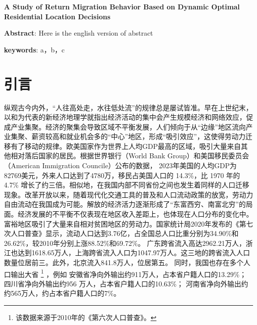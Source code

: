 \documentclass[
  a4paper,
  zihao=-4,
  fontset=mac,
  AutoFakeBold,
  AutoFakeSlant,
  oneside]{ctexbook}
\let\oldfootnote\footnote
\renewcommand{\footnote}[1]{%
  \oldfootnote{\setstretch{1.5}#1}%
}
\begin{document}
\begin{center}
    {
    \textbf{A Study of Return Migration Behavior Based on Dynamic Optimal Residential Location Decisions}
    }
\end{center}

{
\textbf{Abstract}: Here is the english version of abstract

\textbf{keywords}: a，b，c
}



\frontmatter
\renewcommand{\thepage}{\Roman{page}} %

%

\newpage
\tableofcontents
\thispagestyle{empty}

\mainmatter
\newpage
\chapter{引言}

纵观古今内外，“人往高处走，水往低处流”的规律总是屡试皆准。早在上世纪末，以\textcite{krugmanIncreasingReturnsEconomic1991}和\textcite{fujitaSpatialEconomyCities1999}为代表的新经济地理学就指出经济活动的集中会产生规模经济和网络效应，促成产业集聚。经济的聚集会导致区域不平衡发展，人们倾向于从“边缘”地区流向产业集聚、薪资较高和就业机会多的“中心”地区，形成“吸引效应”，这使得劳动力迁移有了移动的规律。欧美国家作为世界上人均GDP最高的区域，吸引大量来自其他相对落后国家的居民。根据世界银行（World Bank Group）和美国移民委员会（American Immigration Councile）公布的数据，
2023年美国的人均GDP为82769美元，外来人口达到了4780万，移民占美国人口的 14.3\%，比 1970 年的 4.7\% 增长了约三倍。相似地，在我国内部不同省份之间也发生着同样的人口迁移现象。改革开放以来，随着现代化交通工具的普及和人口流动政策的放宽，劳动力自由流动在我国成为可能。解放的经济活力逐渐形成了“东富西穷、南富北穷”的局面。经济发展的不平衡不仅表现在地区收入差距上，也体现在人口分布的变化中。富裕地区吸引了大量来自相对贫困地区的劳动力。国家统计局2020年发布的《第七次人口普查》显示，流动人口达到3.76亿，占全国总人口比重分别为34.90\%和26.62\%，较2010年分别上涨88.52\%和69.72\%。
广东跨省流入高达2962.21万人，浙江也达到1618.65万人，上海跨省流入人口为1047.97万人。这三地的跨省流入人口数量位居前三。此外，北京流入841.8万人，位居第五。
同时，我国也存在多个人口输出大省\footnote{该数据来源于2010年的《第六次人口普查》。}，例如
安徽省净向外输出约911万人，占本省户籍人口的13.29\%；
四川省净向外输出约956 万人，占本省户籍人口的10.63\%；
河南省净向外输出约约565万人，约占本省户籍人口的7\%。
\end{document}
